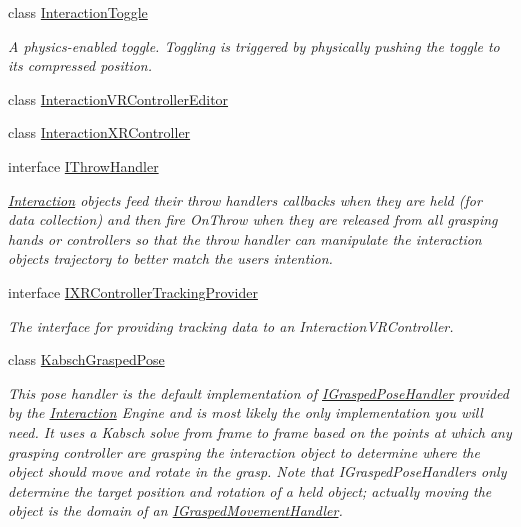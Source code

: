 \begin{DoxyCompactItemize}
\item 
class \mbox{\hyperlink{class_leap_1_1_unity_1_1_interaction_1_1_interaction_toggle}{Interaction\+Toggle}}
\begin{DoxyCompactList}\small\item\em A physics-\/enabled toggle. Toggling is triggered by physically pushing the toggle to its compressed position. \end{DoxyCompactList}\item 
class \mbox{\hyperlink{class_leap_1_1_unity_1_1_interaction_1_1_interaction_v_r_controller_editor}{Interaction\+V\+R\+Controller\+Editor}}
\item 
class \mbox{\hyperlink{class_leap_1_1_unity_1_1_interaction_1_1_interaction_x_r_controller}{Interaction\+X\+R\+Controller}}
\item 
interface \mbox{\hyperlink{interface_leap_1_1_unity_1_1_interaction_1_1_i_throw_handler}{I\+Throw\+Handler}}
\begin{DoxyCompactList}\small\item\em \mbox{\hyperlink{namespace_leap_1_1_unity_1_1_interaction}{Interaction}} objects feed their throw handlers callbacks when they are held (for data collection) and then fire On\+Throw when they are released from all grasping hands or controllers so that the throw handler can manipulate the interaction object\textquotesingle{}s trajectory to better match the user\textquotesingle{}s intention. \end{DoxyCompactList}\item 
interface \mbox{\hyperlink{interface_leap_1_1_unity_1_1_interaction_1_1_i_x_r_controller_tracking_provider}{I\+X\+R\+Controller\+Tracking\+Provider}}
\begin{DoxyCompactList}\small\item\em The interface for providing tracking data to an Interaction\+V\+R\+Controller. \end{DoxyCompactList}\item 
class \mbox{\hyperlink{class_leap_1_1_unity_1_1_interaction_1_1_kabsch_grasped_pose}{Kabsch\+Grasped\+Pose}}
\begin{DoxyCompactList}\small\item\em This pose handler is the default implementation of \mbox{\hyperlink{interface_leap_1_1_unity_1_1_interaction_1_1_i_grasped_pose_handler}{I\+Grasped\+Pose\+Handler}} provided by the \mbox{\hyperlink{namespace_leap_1_1_unity_1_1_interaction}{Interaction}} Engine and is most likely the only implementation you will need. It uses a Kabsch solve from frame to frame based on the points at which any grasping controller are grasping the interaction object to determine where the object should move and rotate in the grasp. Note that I\+Grasped\+Pose\+Handlers only determine the target position and rotation of a held object; actually moving the object is the domain of an \mbox{\hyperlink{interface_leap_1_1_unity_1_1_interaction_1_1_i_grasped_movement_handler}{I\+Grasped\+Movement\+Handler}}. \end{DoxyCompactList}\item 

\end{DoxyCompactItemize}
